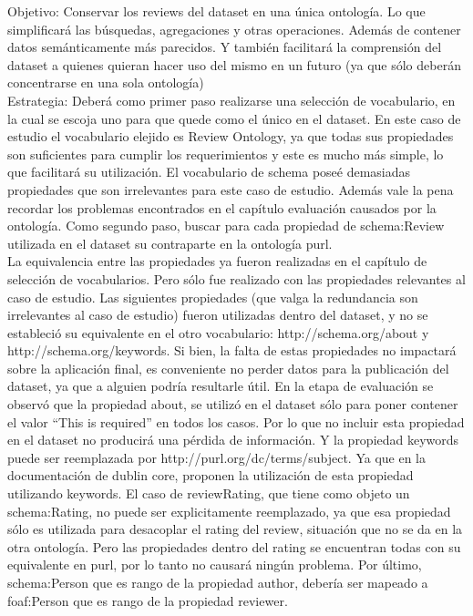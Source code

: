 Objetivo: Conservar los reviews del dataset en una única ontología. Lo que simplificará las búsquedas, agregaciones y otras operaciones.
Además de contener datos semánticamente más parecidos. Y también facilitará la comprensión del dataset a quienes quieran hacer uso del mismo
en un futuro (ya que sólo deberán concentrarse en una sola ontología)
\\
Estrategia: Deberá como primer paso realizarse una selección de vocabulario, en la cual se escoja uno para que quede como el único en el dataset.
En este caso de estudio el vocabulario elejido es Review Ontology, ya que todas sus propiedades son suficientes para cumplir los requerimientos y 
este es mucho más simple, lo que facilitará su utilización. El vocabulario de schema poseé demasiadas propiedades que son irrelevantes para este caso de estudio. 
Además vale la pena recordar los problemas encontrados en el capítulo evaluación causados por la ontología.
Como segundo paso, buscar para cada propiedad de schema:Review utilizada en el dataset su contraparte en la ontología purl.\\
La equivalencia entre las propiedades ya fueron realizadas en el capítulo de selección de vocabularios. Pero sólo fue realizado con las propiedades 
relevantes al caso de estudio. Las siguientes propiedades (que valga la redundancia son irrelevantes al caso de estudio) fueron utilizadas dentro del dataset, y 
no se estableció su equivalente en el otro vocabulario:
http://schema.org/about y http://schema.org/keywords. 
Si bien, la falta de estas propiedades no impactará sobre la aplicación final, es conveniente no perder datos para la publicación del dataset, ya que 
a alguien podría resultarle útil. 
En la etapa de evaluación se observó que la propiedad about, se utilizó en el dataset sólo para poner contener el valor ``This is required'' en todos los casos. 
Por lo que no incluir esta propiedad en el dataset no producirá una pérdida de información.
Y la propiedad keywords puede ser reemplazada por http://purl.org/dc/terms/subject. Ya que en la documentación de dublin core, proponen la utilización de esta propiedad 
utilizando keywords.
El caso de reviewRating, que tiene como objeto un schema:Rating, no puede ser explicitamente reemplazado, ya que esa propiedad 
sólo es utilizada para desacoplar el rating del review, situación que no se da en la otra ontología. Pero las propiedades dentro del rating se encuentran todas 
con su equivalente en purl, por lo tanto no causará ningún problema.
Por último, schema:Person que es rango de la propiedad author, debería ser mapeado a foaf:Person que es rango de la propiedad reviewer. 
